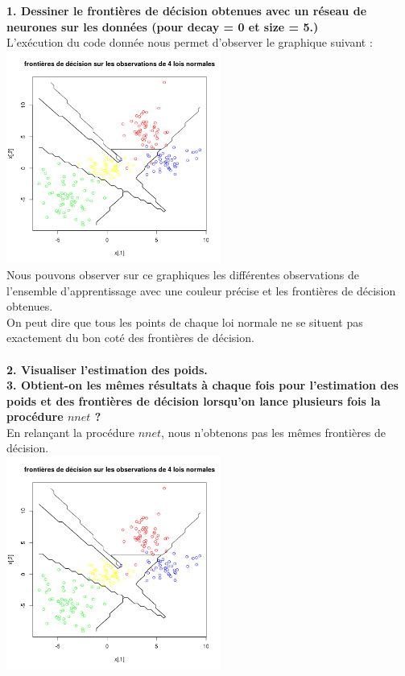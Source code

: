 \documentclass[a4paper, 10pt]{article}
\begin{document}
\textbf{1. Dessiner le frontières de décision obtenues avec un réseau de neurones sur les données (pour decay = 0 et size = 5.)}\\
L'exécution du code donnée nous permet d'observer le graphique suivant :\\
\includegraphics[height = 7cm, width = 7cm]{plots/frontiere_bayes_q2_1.png}\\
Nous pouvons observer sur ce graphiques les différentes observations de l'ensemble d'apprentissage avec une couleur précise et les frontières de décision obtenues.\\
On peut dire que tous les points de chaque loi normale ne se situent pas exactement du bon coté des frontières de décision.\\ \\
\textbf{2. Visualiser l'estimation des poids.}\\
\textbf{3. Obtient-on les mêmes résultats à chaque fois pour l'estimation des poids et des frontières de décision lorsqu'on lance plusieurs fois la procédure $nnet$ ?}\\
En relançant la procédure $nnet$, nous n'obtenons pas les mêmes frontières de décision.\\
\includegraphics[height = 7cm, width = 7cm]{plots/frontiere_bayes_q2_1.png}
\end{document}
